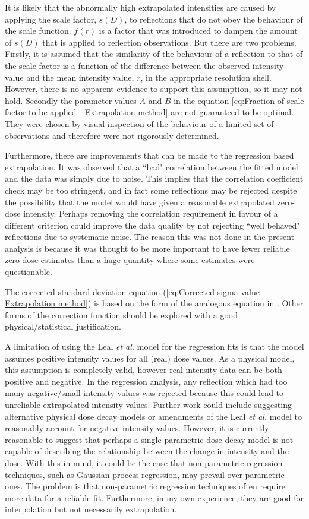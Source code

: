 It is likely that the abnormally high extrapolated intensities are caused by applying the scale factor, $s(D)$, to reflections that do not obey the behaviour of the scale function.
$f(r)$ is a factor that was introduced to dampen the amount of $s(D)$ that is applied to reflection observations.
But there are two problems.
Firstly, it is assumed that the similarity of the behaviour of a reflection to that of the scale factor is a function of the difference between the observed intensity value and the mean intensity value, $r$, in the appropriate resolution shell.
However, there is no apparent evidence to support this assumption, so it may not hold.
Secondly the parameter values $A$ and $B$ in the equation \ref{eq:Fraction of scale factor to be applied - Extrapolation method} are not guaranteed to be optimal.
They were chosen by visual inspection of the behaviour of a limited set of observations and therefore were not rigorously determined.

Furthermore, there are improvements that can be made to the regression based extrapolation.
It was observed that a ``bad" correlation between the fitted model and the data was simply due to noise.
This implies that the correlation coefficient check may be too stringent, and in fact some reflections may be rejected despite the possibility that the model would have given a reasonable extrapolated zero-dose intensity.
Perhaps removing the correlation requirement in favour of a different criterion could improve the data quality by not rejecting ``well behaved" reflections due to systematic noise.
The reason this was not done in the present analysis is because it was thought to be more important to have fewer reliable zero-dose estimates than a huge quantity where some estimates were questionable.

The corrected standard deviation equation (\ref{eq:Corrected sigma value - Extrapolation method}) is based on the form of the analogous equation in \cite{diederichs2003}.
Other forms of the correction function should be explored with a good physical/statistical justification.

A limitation of using the Leal \textit{et al.} model for the regression fits is that the model assumes positive intensity values for all (real) dose values.
As a physical model, this assumption is completely valid, however real intensity data can be both positive and negative.
In the regression analysis, any reflection which had too many negative/small intensity values was rejected because this could lead to unreliable extrapolated intensity values.
Further work could include suggesting alternative physical dose decay models or amendments of the Leal \textit{et al.} model to reasonably account for negative intensity values.
However, it is currently reasonable to suggest that perhaps a single parametric dose decay model is not capable of describing the relationship between the change in intensity and the dose.
With this in mind, it could be the case that non-parametric regression techniques, such as Gaussian process regression, may prevail over parametric ones.
The problem is that non-parametric regression techniques often require more data for a reliable fit.
Furthermore, in my own experience, they are good for interpolation but not necessarily extrapolation.

